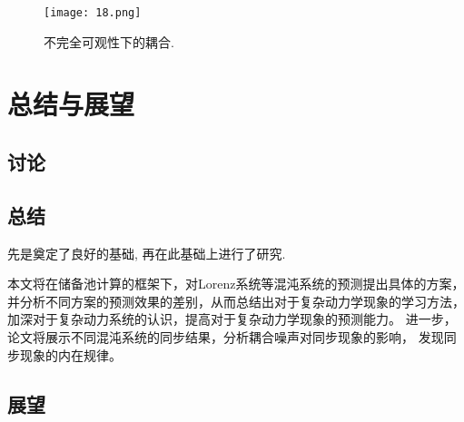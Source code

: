 \documentclass[notitlepage,cs4size,punct,oneside]{ctexrep}
\numberwithin{equation}{chapter}
\theoremstyle{mystyle}
\begin{document}
\begin{figure}[htbp]
    \centering
    \texttt{[image: 18.png]}
    \caption{不完全可观性下的耦合.}
\end{figure}




\chapter{总结与展望}

\section{讨论}

\section{总结}
先是奠定了良好的基础, 再在此基础上进行了研究. 

本文将在储备池计算的框架下，对Lorenz系统等混沌系统的预测提出具体的方案，
并分析不同方案的预测效果的差别，从而总结出对于复杂动力学现象的学习方法，
加深对于复杂动力系统的认识，提高对于复杂动力学现象的预测能力。
进一步，论文将展示不同混沌系统的同步结果，分析耦合噪声对同步现象的影响，
发现同步现象的内在规律。
\section{展望}







\end{document}
